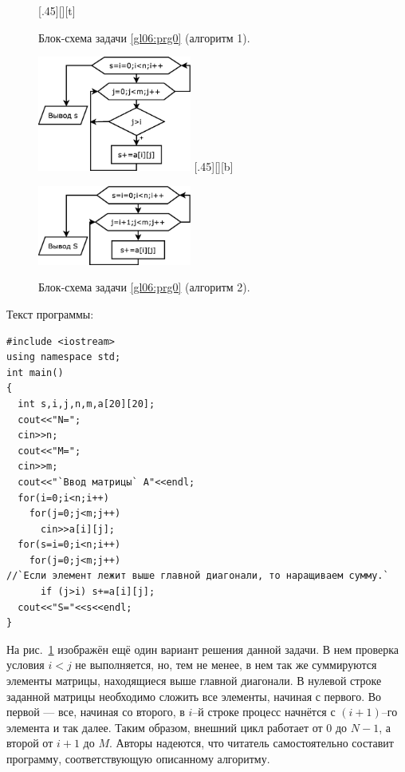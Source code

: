 \begin{figure}[H]
\begin{floatrow}
[.45\textwidth][\FBheight][t]
{\caption{Блок-схема задачи \ref{gl06:prg0} (алгоритм 1).}
\label{ch06:refDrawing6}}
{\includegraphics[width=0.45\textwidth,keepaspectratio]{img/ris_6_7}}\hspace*{0.05\textwidth}
%
[.45\textwidth][\FBheight][b]
{\caption{Блок-схема задачи \ref{gl06:prg0} (алгоритм 2).}
\label{ch06:refDrawing7}}
{\includegraphics[width=0.45\textwidth,keepaspectratio]{img/ris_6_8}}
\end{floatrow}
\end{figure}



Текст программы: 
\begin{lstlisting}
#include <iostream>
using namespace std;
int main()
{
  int s,i,j,n,m,a[20][20]; 
  cout<<"N=";
  cin>>n;
  cout<<"M=";
  cin>>m;
  cout<<"`Ввод матрицы` A"<<endl;
  for(i=0;i<n;i++)
    for(j=0;j<m;j++)
      cin>>a[i][j];
  for(s=i=0;i<n;i++)
    for(j=0;j<m;j++)
//`Если элемент лежит выше главной диагонали, то наращиваем сумму.` 
      if (j>i) s+=a[i][j];
  cout<<"S="<<s<<endl;
}
\end{lstlisting}

На рис.~\ref{ch06:refDrawing7} изображён ещё один вариант решения данной задачи. 
В нем проверка условия  $i<j$ не выполняется, но, тем не менее, в нем так же 
суммируются элементы матрицы, находящиеся выше главной диагонали. В
нулевой строке заданной матрицы необходимо сложить все элементы, начиная с первого. Во первой --- все, начиная со
второго, в $i$–й строке процесс начнётся с $(i+1)$–го элемента и так далее. Таким образом, внешний цикл работает от 0 до
$N-1$, а второй от $i+1$ до $M$. Авторы надеются, что читатель самостоятельно составит программу, соответствующую
описанному алгоритму.

